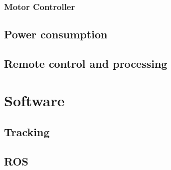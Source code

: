 		\subsection{Motor Controller}	
	
	\section{Power consumption}
	
	\section{Remote control and processing}


\chapter{Software}\label{software}

	\section{Tracking}\label{tracking}
	
	\section{ROS}\label{ros}